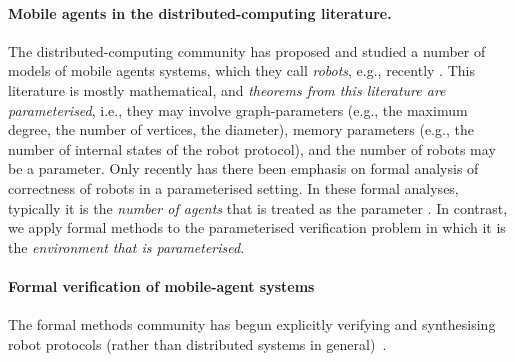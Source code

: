 \fi

\paragraph{Mobile agents in the distributed-computing literature.}
The distributed-computing community has proposed and studied a number of models of mobile agents systems, which they call \emph{robots}, e.g., recently
\cite{Bender20021,KKR06,GR08,Das13,Diks200438,Cohen05graphexploration,FIPPP04}. This literature is mostly mathematical, and {\em theorems from this literature are parameterised}, i.e., they may involve {graph-parameters} (e.g., the maximum degree, the number of vertices, the diameter), {memory parameters} (e.g., the number of internal states of the robot protocol), and the {number of robots} may be a parameter.
Only recently has there been emphasis on formal analysis of correctness of robots in a parameterised
setting. In these formal analyses, typically it is the {\em number of agents} that is treated as the parameter \cite{KoLo13AAMAS,KoLo13IJCAI,ABCTU13,MPST14,KoLo15,DBLP:journals/ai/KouvarosL16}. In contrast, we apply formal methods to the parameterised verification problem in which it is the {\em environment that is parameterised}.


\paragraph{Formal verification of mobile-agent systems}


The formal methods community has begun explicitly verifying and synthesising robot protocols (rather than distributed systems in general)~\cite{HMM11,Bonnet12,Berard13,ABCTU13,DBLP:journals/ipl/CourtieuRTU15,DBLP:conf/wdag/CourtieuRTU16,MPST14,KoLo15}.


